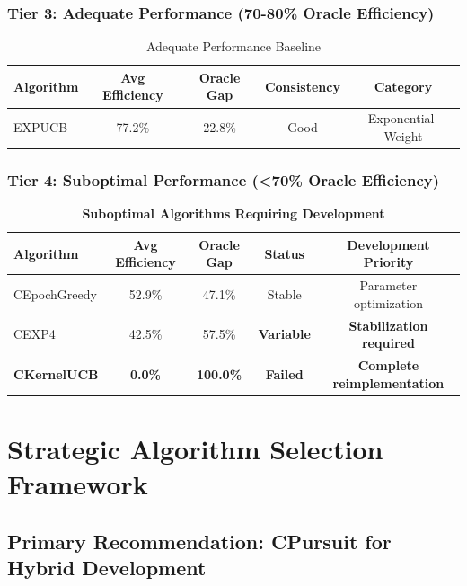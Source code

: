\documentclass[12pt,a4paper]{article}
\newcommand{\critical}[1]{\textcolor{criticalcolor}{\textbf{#1}}}
\begin{document}
\subsubsection{Tier 3: Adequate Performance (70-80\% Oracle Efficiency)}

\begin{table}[H]
\centering
\caption{Adequate Performance Baseline}
\begin{tabular}{|l|c|c|c|c|}
\hline
\textbf{Algorithm} & \textbf{Avg Efficiency} & \textbf{Oracle Gap} & \textbf{Consistency} & \textbf{Category} \\
\hline
\hline
EXPUCB & 77.2\% & 22.8\% & Good & Exponential-Weight \\
\hline
\end{tabular}
\end{table}

\subsubsection{Tier 4: Suboptimal Performance (<70\% Oracle Efficiency)}

\begin{table}[H]
\centering
\caption{\critical{Suboptimal Algorithms Requiring Development}}
\begin{tabular}{|l|c|c|c|c|}
\hline
\textbf{Algorithm} & \textbf{Avg Efficiency} & \textbf{Oracle Gap} & \textbf{Status} & \textbf{Development Priority} \\
\hline
\hline
CEpochGreedy & 52.9\% & 47.1\% & Stable & Parameter optimization \\
CEXP4 & 42.5\% & 57.5\% & \critical{Variable} & \critical{Stabilization required} \\
\critical{CKernelUCB} & \critical{0.0\%} & \critical{100.0\%} & \critical{Failed} & \critical{Complete reimplementation} \\
\hline
\end{tabular}
\end{table}

\section{Strategic Algorithm Selection Framework}

\subsection{Primary Recommendation: CPursuit for Hybrid Development}
\end{document}
